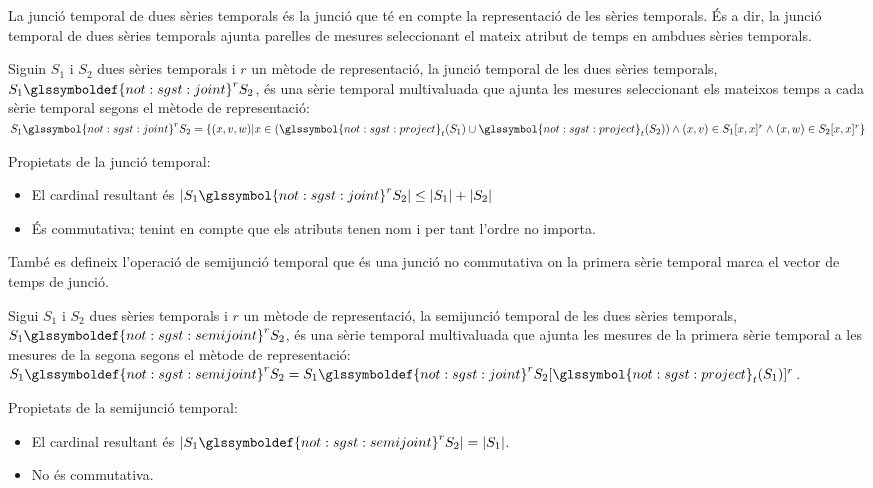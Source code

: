 La junció temporal de dues sèries temporals és la junció que té en
compte la representació de les sèries temporals. És a dir, la junció
temporal de dues sèries temporals ajunta parelles de mesures
seleccionant el mateix atribut de temps en ambdues sèries temporals.


\begin{definition}\label{def:sgst:joint}
  Siguin $S_1$ i $S_2$ dues sèries temporals i $r$ un mètode de
  representació, la junció temporal de les dues sèries temporals, $S_1
  \glssymboldef{not:sgst:joint}^r S_2$, és una sèrie temporal
  multivaluada que ajunta les mesures seleccionant els mateixos temps
  a cada sèrie temporal segons el mètode de representació: $S_1
  \glssymbol{not:sgst:joint}^r S_2 = \{ (x,v,w) | x \in
  (\glssymbol{not:sgst:project}_{t}(S_1) \cup
  \glssymbol{not:sgst:project}_{t}(S_2)) \wedge (x,v) \in S_1[x,x]^r
  \wedge (x,w) \in S_2[x,x]^r \}$
\end{definition}


Propietats de la junció temporal:
\begin{itemize}
\item El cardinal resultant és $|S_1 \glssymbol{not:sgst:joint}^r S_2|
  \leq |S_1| + |S_2|$
\item És commutativa; tenint en compte que els atributs tenen nom i
  per tant l'ordre no importa.
\end{itemize}



També es defineix l'operació de semijunció temporal que és una junció
no commutativa on la primera sèrie temporal marca el vector de temps
de junció.

\begin{definition}
  Sigui $S_1$ i $S_2$ dues sèries temporals i $r$ un mètode
  de representació, la semijunció temporal de les dues sèries
  temporals, $S_1 \glssymboldef{not:sgst:semijoint}^r S_2$, és una
  sèrie temporal multivaluada que ajunta les mesures de la primera
  sèrie temporal a les mesures de la segona segons el mètode de
  representació: $S_1 \glssymboldef{not:sgst:semijoint}^r S_2 = S_1
  \glssymboldef{not:sgst:joint}^r S_2[\glssymbol{not:sgst:project}_{t}(S_1)]^r$.
\end{definition}


Propietats de la semijunció temporal:
\begin{itemize}
\item El cardinal resultant és $|S_1
  \glssymboldef{not:sgst:semijoint}^r S_2| = |S_1|$.
\item No és commutativa.
\end{itemize}















